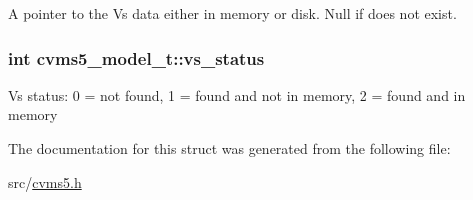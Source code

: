 A pointer to the Vs data either in memory or disk. Null if does not exist. \hypertarget{structcvms5__model__t_a77462a1085b53b84ce91d72943aa6801}{
\subsubsection[{vs\+\_\+status}]{\setlength{\rightskip}{0pt plus 5cm}int cvms5\+\_\+model\+\_\+t\+::vs\+\_\+status}}\label{structcvms5__model__t_a77462a1085b53b84ce91d72943aa6801}
Vs status\+: 0 = not found, 1 = found and not in memory, 2 = found and in memory 

The documentation for this struct was generated from the following file\+:\begin{DoxyCompactItemize}
\item 
src/\hyperlink{cvms5_8h}{cvms5.\+h}\end{DoxyCompactItemize}
